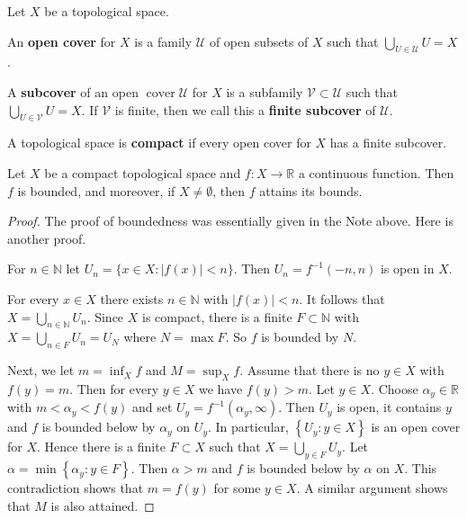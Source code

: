 \documentclass[a4paper]{article}
\begin{document}
\begin{definition}
    Let $X$ be a topological space.

    An \textbf{open cover} for $X$ is a family $\mathcal{U}$ of open subsets of $X$ such that $\bigcup_{U \in \mathcal{U}} U=X$.

    A \textbf{subcover} of an open $\operatorname{cover} \mathcal{U}$ for $X$ is a subfamily $\mathcal{V} \subset \mathcal{U}$ such that
    $\bigcup_{U \in \mathcal{V}} U=X$. If $\mathcal{V}$ is finite, then we call this a \textbf{finite subcover} of $\mathcal{U}$.

    A topological space is \textbf{compact} if every open cover for $X$ has a finite subcover.
\end{definition}

\begin{theorem}\label{thm:continuous on compact -> bounded}
    Let $X$ be a compact topological space and $f: X \rightarrow \mathbb{R}$ a continuous function.
Then $f$ is bounded, and moreover, if $X \neq \emptyset$, then $f$ attains its bounds.
\end{theorem}
\begin{proof}
    The proof of boundedness was essentially given in the Note above. Here is another proof.

    For $n \in \mathbb{N}$ let $U_{n}=\{x \in X:|f(x)|<n\}$. Then $U_{n}=f^{-1}(-n, n)$ is open in $X$.

    For every $x \in X$ there exists $n \in \mathbb{N}$ with $|f(x)|<n$. It follows that
    $X=\bigcup_{n \in \mathbb{N}} U_{n}$. Since $X$ is compact, there is a finite $F \subset \mathbb{N}$ with
    $X=\bigcup_{n \in F} U_{n}=U_{N}$ where $N=\max F$. So $f$ is bounded by $N$.

    Next, we let $m=\inf _{X} f$ and $M=\sup _{X} f$. Assume that there is no $y \in X$ with $f(y)=m$. Then for every $y \in X$ we have $f(y)>m$. Let $y \in X$. Choose $\alpha_{y} \in \mathbb{R}$ with $m<\alpha_{y}<f(y)$ and set $U_{y}=f^{-1}\left(\alpha_{y}, \infty\right)$. Then $U_{y}$ is open, it contains $y$ and $f$ is bounded below by $\alpha_{y}$ on $U_{y}$. In particular, $\left\{U_{y}: y \in X\right\}$ is an open cover for $X$. Hence there is a finite $F \subset X$ such that $X=\bigcup_{y \in F} U_{y}$. Let $\alpha=\min \left\{\alpha_{y}: y \in F\right\}$. Then $\alpha>m$ and $f$ is bounded below by $\alpha$ on $X$. This contradiction shows that $m=f(y)$ for some $y \in X$. A similar argument shows that $M$ is also attained.
\end{proof}
\end{document}
